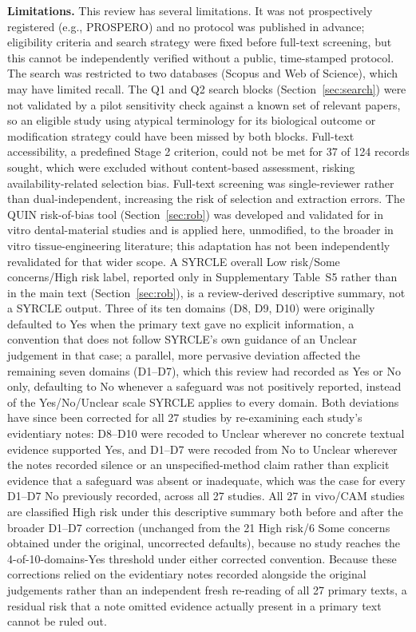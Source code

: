 \documentclass[5p,times,twocolumn]{elsarticle}
\begin{document}
\textbf{Limitations.} This review has several limitations. It was not prospectively registered (e.g., PROSPERO) and no protocol was published in advance; eligibility criteria and search strategy were fixed before full-text screening, but this cannot be independently verified without a public, time-stamped protocol. The search was restricted to two databases (Scopus and Web of Science), which may have limited recall. The Q1 and Q2 search blocks (Section~\ref{sec:search}) were not validated by a pilot sensitivity check against a known set of relevant papers, so an eligible study using atypical terminology for its biological outcome or modification strategy could have been missed by both blocks. Full-text accessibility, a predefined Stage 2 criterion, could not be met for 37 of 124 records sought, which were excluded without content-based assessment, risking availability-related selection bias. Full-text screening was single-reviewer rather than dual-independent, increasing the risk of selection and extraction errors. The QUIN risk-of-bias tool (Section~\ref{sec:rob}) was developed and validated for in vitro dental-material studies and is applied here, unmodified, to the broader in vitro tissue-engineering literature; this adaptation has not been independently revalidated for that wider scope. A SYRCLE overall Low risk/Some concerns/High risk label, reported only in Supplementary Table~S5 rather than in the main text (Section~\ref{sec:rob}), is a review-derived descriptive summary, not a SYRCLE output. Three of its ten domains (D8, D9, D10) were originally defaulted to Yes when the primary text gave no explicit information, a convention that does not follow SYRCLE's own guidance of an Unclear judgement in that case; a parallel, more pervasive deviation affected the remaining seven domains (D1--D7), which this review had recorded as Yes or No only, defaulting to No whenever a safeguard was not positively reported, instead of the Yes/No/Unclear scale SYRCLE applies to every domain. Both deviations have since been corrected for all 27 studies by re-examining each study's evidentiary notes: D8--D10 were recoded to Unclear wherever no concrete textual evidence supported Yes, and D1--D7 were recoded from No to Unclear wherever the notes recorded silence or an unspecified-method claim rather than explicit evidence that a safeguard was absent or inadequate, which was the case for every D1--D7 No previously recorded, across all 27 studies. All 27 in vivo/CAM studies are classified High risk under this descriptive summary both before and after the broader D1--D7 correction (unchanged from the 21 High risk/6 Some concerns obtained under the original, uncorrected defaults), because no study reaches the 4-of-10-domains-Yes threshold under either corrected convention. Because these corrections relied on the evidentiary notes recorded alongside the original judgements rather than an independent fresh re-reading of all 27 primary texts, a residual risk that a note omitted evidence actually present in a primary text cannot be ruled out.
\end{document}
